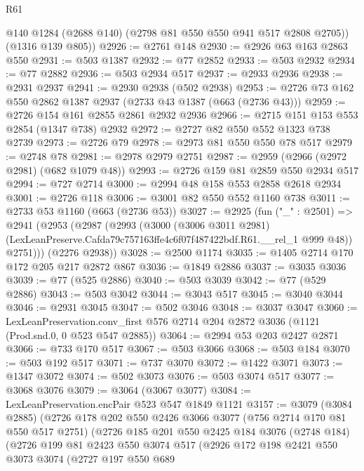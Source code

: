 \begin{lexlean}{R61}
\begin{coremodule}
        @140
        @1284
        (@2688 @140)
        (@2798 @81 @550 @550 @941 @517 @2808 @2705))
      (@1316 @139 @805))
@2926 := @2761 @148
@2930 := @2926 @63 @163 @2863 @550
@2931 := @503 @1387
@2932 := @77 @2852
@2933 := @503 @2932
@2934 := @77 @2882
@2936 := @503 @2934 @517
@2937 := @2933 @2936
@2938 := @2931 @2937
@2941 := @2930 @2938 (@502 @2938)
@2953 := @2726 @73 @162 @550 @2862 @1387 @2937 (@2733 @43 @1387 (@663 (@2736 @43)))
@2959 := @2726 @154 @161 @2855 @2861 @2932 @2936
@2966 := @2715 @151 @153 @553 @2854 (@1347 @738) @2932
@2972 := @2727 @82 @550 @552 @1323 @738 @2739
@2973 := @2726 @79
@2978 := @2973 @81 @550 @550 @78 @517
@2979 := @2748 @78
@2981 := @2978 @2979 @2751
@2987 := @2959 (@2966 (@2972 @2981) (@682 @1079 @48))
@2993 := @2726 @159 @81 @2859 @550 @2934 @517
@2994 := @727 @2714
@3000 := @2994 @48 @158 @553 @2858 @2618 @2934
@3001 := @2726 @118
@3006 := @3001 @82 @550 @552 @1160 @738
@3011 := @2733 @53 @1160 (@663 (@2736 @53))
@3027 := @2925
    (fun ("_" : @2501) =>
    @2941
      (@2953
        (@2987
          (@2993
            (@3000
              (@3006 @3011 @2981)
              (LexLeanPreserve.Cafda79c757163ffe4c6f07f487422bdf.R61.__rel_1 @999 @48))
            @2751)))
      (@2276 @2938))
@3028 := @2500 @1174
@3035 := @1405 @2714 @170 @172 @205 @217 @2872 @867
@3036 := @1849 @2886
@3037 := @3035 @3036
@3039 := @77 (@525 @2886)
@3040 := @503 @3039
@3042 := @77 (@529 @2886)
@3043 := @503 @3042
@3044 := @3043 @517
@3045 := @3040 @3044
@3046 := @2931 @3045
@3047 := @502 @3046
@3048 := @3037 @3047
@3060 := LexLeanPreservation.conv_first
    @576
    @2714
    @204
    @2872
    @3036
    (@1121 (Prod.snd.{0, 0} @523 @547 @2885))
@3064 := @2994 @53 @203 @2427 @2871
@3066 := @733 @170 @517
@3067 := @503 @3066
@3068 := @503 @184
@3070 := @503 @192 @517
@3071 := @737 @3070
@3072 := @1422 @3071
@3073 := @1347 @3072
@3074 := @502 @3073
@3076 := @503 @3074 @517
@3077 := @3068 @3076
@3079 := @3064 (@3067 @3077)
@3084 := LexLeanPreservation.encPair @523 @547 @1849 @1121
@3157 := @3079
    (@3084 @2885)
    (@2726
      @178
      @202
      @550
      @2426
      @3066
      @3077
      (@756 @2714 @170 @81 @550 @517 @2751)
      (@2726
        @185
        @201
        @550
        @2425
        @184
        @3076
        (@2748 @184)
        (@2726
          @199
          @81
          @2423
          @550
          @3074
          @517
          (@2926
            @172
            @198
            @2421
            @550
            @3073
            @3074
            (@2727
              @197
              @550
              @689

\end{coremodule}
\end{lexlean}
